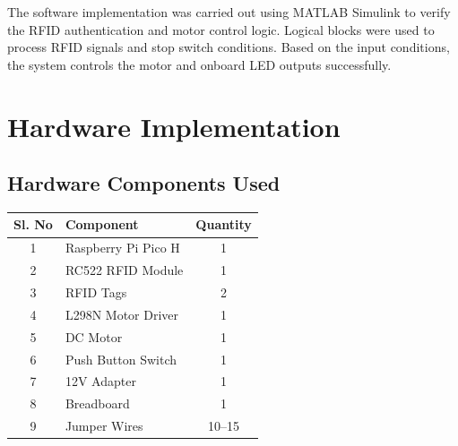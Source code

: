\documentclass[12pt,a4paper,oneside]{report}
\begin{document}
The software implementation was carried out using MATLAB Simulink to verify the RFID authentication and motor control logic. Logical blocks were used to process RFID signals and stop switch conditions. Based on the input conditions, the system controls the motor and onboard LED outputs successfully.


\chapter{Hardware Implementation}

\section{Hardware Components Used}

\begin{table}[H]
\centering
\renewcommand{\arraystretch}{1.5}

\begin{tabular}{|c|p{7cm}|c|}
\hline

\textbf{Sl. No} & \textbf{Component} & \textbf{Quantity} \\

\hline

1 & Raspberry Pi Pico H & 1 \\

\hline

2 & RC522 RFID Module & 1 \\

\hline

3 & RFID Tags & 2 \\

\hline

4 & L298N Motor Driver & 1 \\

\hline

5 & DC Motor & 1 \\

\hline

6 & Push Button Switch & 1 \\

\hline

7 & 12V Adapter & 1 \\

\hline

8 & Breadboard & 1 \\

\hline

9 & Jumper Wires & 10--15 \\

\hline

\end{tabular}


\end{table}
\end{document}
